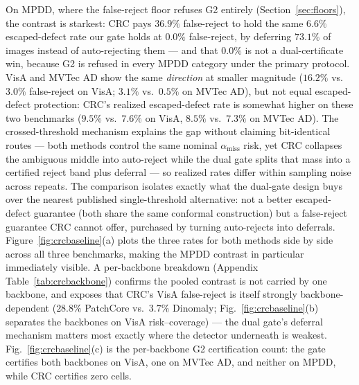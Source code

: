 \documentclass[preprint,11pt]{elsarticle}
\begin{document}
On MPDD, where the false-reject floor refuses G2 entirely (Section~\ref{sec:floors}), the contrast
is starkest: CRC pays $36.9\%$ false-reject to hold the same $6.6\%$ escaped-defect rate our gate
holds at $0.0\%$ false-reject, by deferring $73.1\%$ of images instead of auto-rejecting them ---
and that $0.0\%$ is not a dual-certificate win, because G2 is refused in every MPDD category under
the primary protocol. VisA and MVTec AD show the same \emph{direction} at smaller magnitude
($16.2\%$ vs.\ $3.0\%$ false-reject on VisA; $3.1\%$ vs.\ $0.5\%$ on MVTec AD), but not equal
escaped-defect protection: CRC's realized escaped-defect rate is somewhat higher on these two
benchmarks ($9.5\%$ vs.\ $7.6\%$ on VisA, $8.5\%$ vs.\ $7.3\%$ on MVTec AD). The crossed-threshold
mechanism explains the gap without claiming bit-identical routes --- both methods control the same
nominal $\alpha_{\text{miss}}$ risk, yet CRC collapses the ambiguous middle into auto-reject while
the dual gate splits that mass into a certified reject band plus deferral --- so realized rates
differ within sampling noise across repeats. The comparison isolates exactly what the dual-gate
design buys over the nearest published single-threshold alternative: not a better escaped-defect
guarantee (both share the same conformal construction) but a false-reject guarantee CRC cannot
offer, purchased by turning auto-rejects into deferrals.
Figure~\ref{fig:crcbaseline}(a) plots the three rates for both methods side by side across all three
benchmarks, making the MPDD contrast in particular immediately visible. A per-backbone breakdown
(Appendix Table~\ref{tab:crcbackbone}) confirms the pooled contrast is not carried by one
backbone, and exposes that CRC's VisA false-reject is itself strongly backbone-dependent
($28.8\%$ PatchCore vs.\ $3.7\%$ Dinomaly; Fig.~\ref{fig:crcbaseline}(b) separates the backbones on VisA risk--coverage) --- the dual gate's deferral mechanism matters most
exactly where the detector underneath is weakest. Fig.~\ref{fig:crcbaseline}(c) is the per-backbone G2 certification count: the gate certifies both backbones on VisA, one on MVTec AD, and neither on MPDD, while CRC certifies zero cells.
\end{document}
